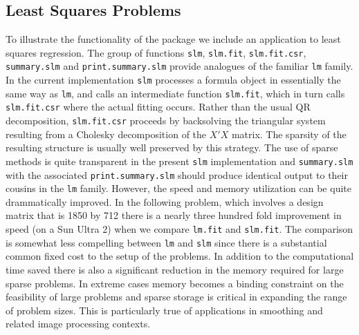 \documentclass{article}
\begin{document}
\subsection{Least Squares Problems}

To illustrate the functionality of the package we include an application to
least squares regression. The group of functions \texttt{slm}, \texttt{slm.fit},
\texttt{slm.fit.csr}, \texttt{summary.slm} and \texttt{print.summary.slm} provide
analogues of the familiar \texttt{lm} family. In the current implementation
\texttt{slm} processes a formula object in essentially the same way as 
\texttt{lm}, and
calls an intermediate function \texttt{slm.fit}, which in turn calls
\texttt{slm.fit.csr} where the actual fitting occurs. Rather than the usual QR
decomposition, \texttt{slm.fit.csr} proceeds by backsolving the triangular
system resulting from a Cholesky decomposition of the $X'X$ matrix. The
sparsity of the resulting structure is usually well preserved by this
strategy. The use of sparse methods is quite transparent in the present 
\texttt{slm} implementation and \texttt{summary.slm} with the associated
\texttt{print.summary.slm} should produce identical output to their cousins in
the \texttt{lm} family. However, the speed and memory utilization can be quite
drammatically improved.  In the following problem, which involves a design
matrix that is 1850 by 712 there is a nearly three hundred fold improvement 
in speed (on a Sun Ultra 2) when we compare 
\texttt{lm.fit} and \texttt{slm.fit}.  The  comparison
is somewhat less compelling between \texttt{lm} and \texttt{slm} since 
there is a substantial common fixed cost to the setup of the problems.
In addition to the computational time saved there is also a significant
reduction in the memory required for large sparse problems.  In extreme
cases memory becomes a binding constraint on the feasibility of large
problems and sparse storage is critical in expanding the range of
problem sizes.  This is particularly true of applications in smoothing
and related image processing contexts.
\end{document}
